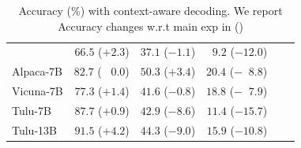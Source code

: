 \documentclass{beamer}
\begin{document}
\begin{frame}
\begin{columns}[t]
\begin{table}[t]
{\begin{tabular}{lrrrrr}
               & \cellcolor{'sgreen'} $66.5$ ($+2.3$)  & \cellcolor{'sred'} $37.1$ ($-1.1$)    & \cellcolor{'sred'}$9.2$ ($-12.0$)    \\
            \multirow{1}{*}{Alpaca-7B}           
               &  $82.7$ ($\;\;\;0.0$)  & \cellcolor{'sgreen'} $50.3$ ($+3.4$)    & \cellcolor{'sred'} $20.4$ ($-\;\;8.8$)    \\
            \multirow{1}{*}{Vicuna-7B}            
               & \cellcolor{'sgreen'} $77.3$ ($+1.4$)   & \cellcolor{'sred'} $41.6$ ($-0.8$)    & \cellcolor{'sred'} $18.8$ ($-\;\;7.9$)       \\
            \multirow{1}{*}{Tulu-7B}             
               & \cellcolor{'sgreen'} $87.7$ ($+0.9$)  & \cellcolor{'sred'} $42.9$ ($-8.6$)     & \cellcolor{'sred'} $11.4$ ($-15.7$)   \\ 
            
            \multirow{1}{*}{Tulu-13B}
               & \cellcolor{'sgreen'} $91.5$ ($+4.2$)  & \cellcolor{'sred'} $44.3$ ($-9.0$)     & \cellcolor{'sred'} $15.9$ ($-10.8$)   \\
                                       \bottomrule
            \end{tabular}
            }
            \caption{
            \footnotesize Accuracy (\%) with context-aware decoding.
            We report Accuracy changes w.r.t main exp in ()
            }
            \label{tab:cad}
            \end{table}
            
    \end{columns}
\end{frame}
\end{document}
